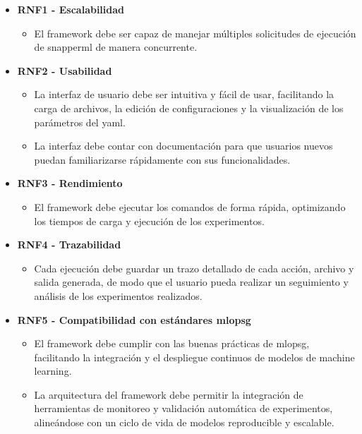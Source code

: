 \begin{itemize}
    \item \textbf{RNF1 - Escalabilidad}
          \begin{itemize}
              \item El \gls{framework} debe ser capaz de manejar múltiples solicitudes de ejecución de \Gls{snapperml} de manera concurrente.
          \end{itemize}
    \item \textbf{RNF2 - Usabilidad}
          \begin{itemize}
              \item La interfaz de usuario debe ser intuitiva y fácil de usar, facilitando la carga de archivos, la edición de configuraciones y la visualización de los parámetros del \acrshort{yaml}.
              \item La interfaz debe contar con documentación para que usuarios nuevos puedan familiarizarse rápidamente con sus funcionalidades.
          \end{itemize}
    \item \textbf{RNF3 - Rendimiento}
          \begin{itemize}
              \item El \gls{framework} debe ejecutar los comandos de forma rápida, optimizando los tiempos de carga y ejecución de los experimentos.
          \end{itemize}
    \item \textbf{RNF4 - Trazabilidad}
          \begin{itemize}
              \item Cada ejecución debe guardar un trazo detallado de cada acción, archivo y salida generada, de modo que el usuario pueda realizar un seguimiento y análisis de los experimentos realizados.
          \end{itemize}
    \item \textbf{RNF5 - Compatibilidad con estándares \Gls{mlopsg}}
          \begin{itemize}
              \item El \gls{framework} debe cumplir con las buenas prácticas de \Gls{mlopsg}, facilitando la integración y el despliegue continuos de modelos de machine learning.
              \item La arquitectura del \gls{framework} debe permitir la integración de herramientas de monitoreo y validación automática de experimentos, alineándose con un ciclo de vida de modelos reproducible y escalable.
          \end{itemize}

\end{itemize}
